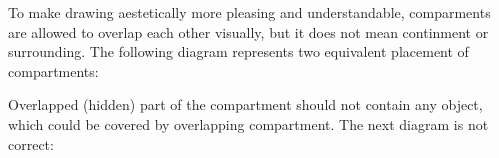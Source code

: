 To make drawing aestetically more pleasing and understandable, comparments are
allowed to overlap each other visually, but it does not mean continment or
surrounding. 
The following diagram represents two equivalent
placement of compartments:

\begin{center}
\end{center}

Overlapped (hidden) part of the compartment should not contain any object,
which could be covered by overlapping compartment. The next diagram is not
correct:

\begin{center}
\end{center}

